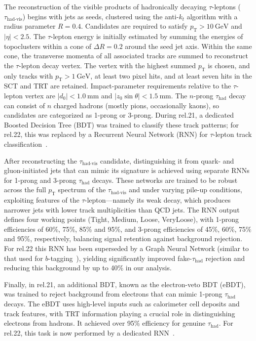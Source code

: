 The reconstruction of the visible products of hadronically decaying $\tau$-leptons ($\tau_{\text{had-vis}}$) begins with jets as seeds, clustered using the anti-\(k_{t}\) algorithm with a radius parameter \(R = 0.4\).  Candidates are required to satisfy \(p_{\text{T}} > 10\ \mathrm{GeV}\) and \(|\eta| < 2.5\).  The \(\tau\)-lepton energy is initially estimated by summing the energies of topoclusters within a cone of \(\Delta R = 0.2\) around the seed jet axis.  Within the same cone, the transverse momenta of all associated tracks are summed to reconstruct the \(\tau\)-lepton decay vertex.  
The vertex with the highest summed \(p_{\text{T}}\) is chosen, and only tracks with \(p_{\text{T}} > 1\ \mathrm{GeV}\), at least two pixel hits, and at least seven hits in the SCT and TRT are retained.  Impact-parameter requirements relative to the \(\tau\)-lepton vertex are \(|d_{0}| < 1.0\ \mathrm{mm}\) and \(|z_{0}\sin\theta| < 1.5\ \mathrm{mm}.\)
The \(n\)-prong \(\tau_{\text{had}}\) decay can consist of \(n\) charged hadrons (mostly pions, occasionally kaons), so candidates are categorized as 1-prong or 3-prong.  During rel.21, a dedicated Boosted Decision Tree (BDT) was trained to classify these track patterns; for rel.22, this was replaced by a Recurrent Neural Network (RNN) for \(\tau\)-lepton track classification~\cite{ATL-PHYS-PUB-2022-044}.  

After reconstructing the \(\tau_{\text{had-vis}}\) candidate, distinguishing it from quark- and gluon-initiated jets that can mimic its signature is achieved using separate RNNs for 1-prong and 3-prong \(\tau_{\text{had}}\) decays.  These networks are trained to be robust across the full \(p_{\text{T}}\) spectrum of the \(\tau_{\text{had-vis}}\) and under varying pile-up conditions, exploiting features of the \(\tau\)-lepton—namely its weak decay, which produces narrower jets with lower track multiplicities than QCD jets.  
The RNN output defines four working points (Tight, Medium, Loose, VeryLoose), with 1-prong efficiencies of 60\%, 75\%, 85\% and 95\%, and 3-prong efficiencies of 45\%, 60\%, 75\% and 95\%, respectively, balancing signal retention against background rejection.  For rel.22 this RNN has been superseded by a Graph Neural Network (similar to that used for \(b\)-tagging~\cite{new_tagging}), yielding significantly improved fake-\(\tau_{\text{had}}\) rejection and reducing this background by up to 40\% in our analysis.  

Finally, in rel.21, an additional BDT, known as the electron-veto BDT (eBDT), was trained to reject background from electrons that can mimic 1-prong \(\tau_{\text{had}}\) decays.  The eBDT uses high-level inputs such as calorimeter cell deposits and track features, with TRT information playing a crucial role in distinguishing electrons from hadrons.  It achieved over 95\% efficiency for genuine \(\tau_{\text{had}}\).  For rel.22, this task is now performed by a dedicated RNN~\cite{ATL-PHYS-PUB-2022-044}.

